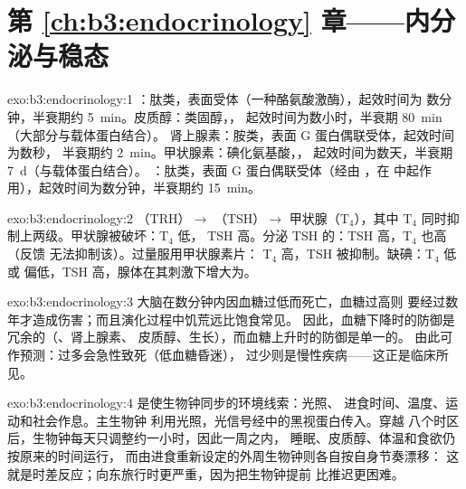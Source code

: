 \section*{第 \ref{ch:b3:endocrinology} 章——内分泌与稳态}

\begin{solution}{exo:b3:endocrinology:1}
：肽类，表面受体（一种酪氨酸激酶），起效时间为
数分钟，半衰期约 \qty{5}{min}。皮质醇：类固醇，，
起效时间为数小时，半衰期 \qty{80}{min}（大部分与载体蛋白结合）。
肾上腺素：胺类，表面 G 蛋白偶联受体，起效时间为数秒，
半衰期约 \qty{2}{min}。甲状腺素：碘化氨基酸，，
起效时间为数天，半衰期 \qty{7}{d}（与载体蛋白结合）。
：肽类，表面 G 蛋白偶联受体（经由 ，在
中起作用），起效时间为数分钟，半衰期约 \qty{15}{min}。
\end{solution}

\begin{solution}{exo:b3:endocrinology:2}
（TRH）$\to$ （TSH）$\to$ 甲状腺（T$_{4}$），其中
T$_{4}$ 同时抑制上两级。甲状腺被破坏：T$_{4}$ 低，
TSH 高。分泌 TSH 的：TSH 高，T$_{4}$ 也高（反馈
无法抑制该）。过量服用甲状腺素片：
T$_{4}$ 高，TSH 被抑制。缺碘：T$_{4}$ 低或
偏低，TSH 高，腺体在其刺激下增大为。
\end{solution}

\begin{solution}{exo:b3:endocrinology:3}
大脑在数分钟内因血糖过低而死亡，血糖过高则
要经过数年才造成伤害；而且演化过程中饥荒远比饱食常见。
因此，血糖下降时的防御是冗余的（、肾上腺素、
皮质醇、生长），而血糖上升时的防御是单一的。
由此可作预测：过多会急性致死（低血糖昏迷），
过少则是慢性疾病——这正是临床所见。
\end{solution}

\begin{solution}{exo:b3:endocrinology:4}
是使生物钟同步的环境线索：光照、
进食时间、温度、运动和社会作息。主生物钟
利用光照，光信号经中的黑视蛋白传入。穿越
八个时区后，生物钟每天只调整约一小时，因此一周之内，
睡眠、皮质醇、体温和食欲仍按原来的时间运行，
而由进食重新设定的外周生物钟则各自按自身节奏漂移：
这就是时差反应；向东旅行时更严重，因为把生物钟提前
比推迟更困难。
\end{solution}

